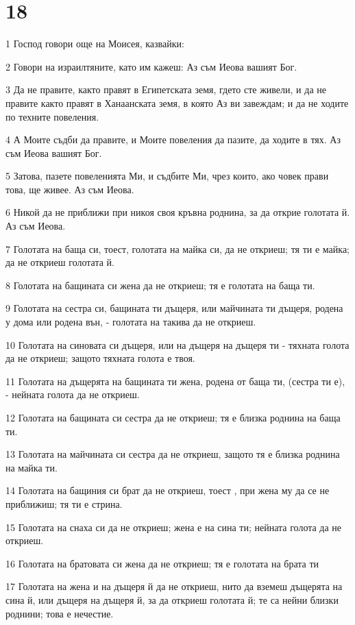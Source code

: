 \chapter{18}

\par 1 Господ говори още на Моисея, казвайки:
\par 2 Говори на израилтяните, като им кажеш: Аз съм Иеова вашият Бог.
\par 3 Да не правите, както правят в Египетската земя, гдето сте живели, и да не правите както правят в Ханаанската земя, в която Аз ви завеждам; и да не ходите по техните повеления.
\par 4 А Моите съдби да правите, и Моите повеления да пазите, да ходите в тях. Аз съм Иеова вашият Бог.
\par 5 Затова, пазете повеленията Ми, и съдбите Ми, чрез които, ако човек прави това, ще живее. Аз съм Иеова.
\par 6 Никой да не приближи при никоя своя кръвна роднина, за да открие голотата й. Аз съм Иеова.
\par 7 Голотата на баща си, тоест, голотата на майка си, да не откриеш; тя ти е майка; да не откриеш голотата й.
\par 8 Голотата на бащината си жена да не откриеш; тя е голотата на баща ти.
\par 9 Голотата на сестра си, бащината ти дъщеря, или майчината ти дъщеря, родена у дома или родена вън, - голотата на такива да не откриеш.
\par 10 Голотата на синовата си дъщеря, или на дъщеря на дъщеря ти - тяхната голота да не откриеш; защото тяхната голота е твоя.
\par 11 Голотата на дъщерята на бащината ти жена, родена от баща ти, (сестра ти е), - нейната голота да не откриеш.
\par 12 Голотата на бащината си сестра да не откриеш; тя е близка роднина на баща ти.
\par 13 Голотата на майчината си сестра да не откриеш, защото тя е близка роднина на майка ти.
\par 14 Голотата на бащиния си брат да не откриеш, тоест , при жена му да се не приближиш; тя ти е стрина.
\par 15 Голотата на снаха си да не откриеш; жена е на сина ти; нейната голота да не откриеш.
\par 16 Голотата на братовата си жена да не откриеш; тя е голотата на брата ти
\par 17 Голотата на жена и на дъщеря й да не откриеш, нито да вземеш дъщерята на сина й, или дъщеря на дъщеря й, за да откриеш голотата й; те са нейни близки роднини; това е нечестие.
